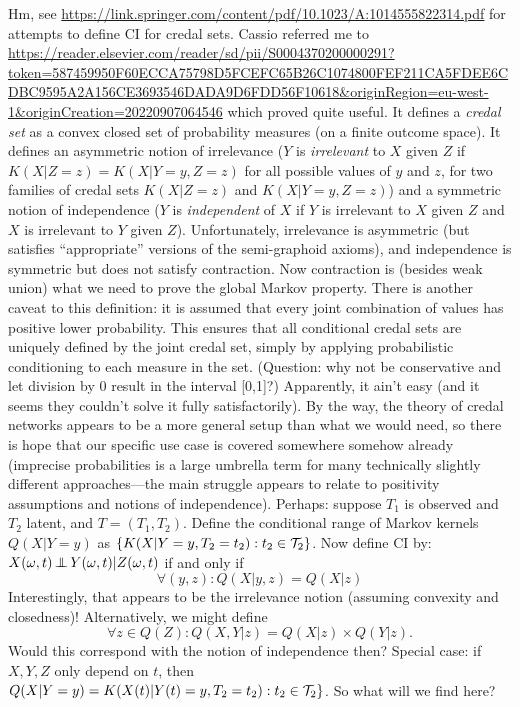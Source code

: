 Hm, see \url{https://link.springer.com/content/pdf/10.1023/A:1014555822314.pdf} for attempts to define CI for credal sets.
Cassio referred me to \url{https://reader.elsevier.com/reader/sd/pii/S0004370200000291?token=587459950F60ECCA75798D5FCEFC65B26C1074800FEF211CA5FDEE6CDBC9595A2A156CE3693546DADA9D6FDD56F10618&originRegion=eu-west-1&originCreation=20220907064546} which proved
quite useful. It defines a \emph{credal set} as a convex closed set of probability measures (on a finite outcome space). 
It defines an asymmetric notion of irrelevance ($Y$ is \emph{irrelevant} to $X$ given $Z$ if $K(X|Z=z) = K(X|Y=y,Z=z)$ for all possible values of $y$ and $z$, for two families of credal sets $K(X|Z=z)$ and $K(X|Y=y,Z=z)$) and a symmetric notion of independence ($Y$ is \emph{independent} of $X$ if $Y$ is irrelevant to $X$ given $Z$ and $X$ is irrelevant to $Y$ given $Z$).
Unfortunately, irrelevance is asymmetric (but satisfies ``appropriate'' versions of the semi-graphoid axioms), and
independence is symmetric but does not satisfy contraction.
Now contraction is (besides weak union) what we need to prove the global Markov property.
There is another caveat to this definition: it is assumed that every joint combination of values has positive lower probability.
This ensures that all conditional credal sets are uniquely defined by the joint credal set, simply by applying probabilistic
conditioning to each measure in the set. (Question: why not be conservative and let division by 0 result in the interval [0,1]?)
Apparently, it ain't easy (and it seems they couldn't solve it fully satisfactorily).
By the way, the theory of credal networks appears to be a more general setup than what we would need, so there is hope that our specific use case is covered somewhere somehow already (imprecise probabilities is a large umbrella term for many technically slightly different approaches---the main struggle appears to relate to positivity assumptions and notions of independence).
Perhaps: suppose $T_1$ is observed and $T_2$ latent, and $T=(T_1,T_2)$. 
Define the conditional range of Markov kernels $Q(X|Y=y)$ as $\{K(X|Y=y,T_2=t_2) : t_2 \in \mathcal{T}_2\}$.
Now define CI by: $X(\omega,t) \operatorname*{\perp\mkern-11mu\perp} Y(\omega,t) | Z(\omega,t)$ if and only if
$$\forall (y,z): Q(X | y,z) = Q(X|z)$$
Interestingly, that appears to be the irrelevance notion (assuming convexity and closedness)!
Alternatively, we might define
$$\forall z\in Q(Z) : Q(X,Y|z) = Q(X|z) \times Q(Y|z).$$
Would this correspond with the notion of independence then?
Special case: if $X,Y,Z$ only depend on $t$, then $Q(X|Y=y) = K(X(t)|Y(t)=y,T_2=t_2) : t_2 \in \mathcal{T}_2\}$.
So what will we find here?


